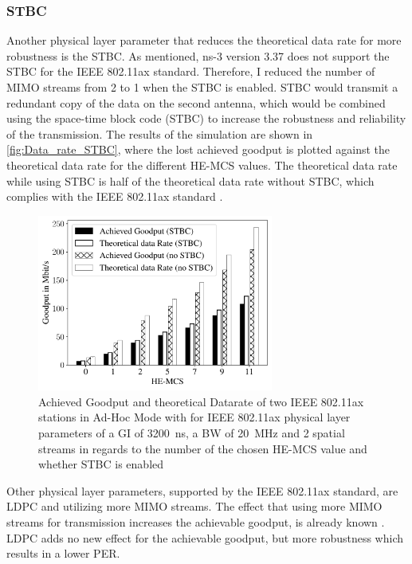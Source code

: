 \subsubsection*{\acf{STBC}}
\label{sec:STBCDataRate}
Another physical layer parameter that reduces the theoretical data rate for more robustness is the \ac{STBC}.
As mentioned, ns-3 version 3.37 does not support the \ac{STBC} for the IEEE 802.11ax standard.
Therefore, I reduced the number of
\ac{MIMO} streams from \num{2} to \num{1} when the \ac{STBC} is enabled. \ac{STBC} would transmit a redundant copy of the data on the second antenna, which would be combined
using the space-time block code (STBC) to increase the robustness and reliability of the transmission.
The results of the simulation are shown in \autoref{fig:Data_rate_STBC}, where the lost achieved goodput is plotted against
the theoretical data rate for the different \ac{HE}-\ac{MCS} values.
The theoretical data rate while using \ac{STBC} is half of the theoretical data rate without \ac{STBC},
which complies with the IEEE 802.11ax standard \cite{ieee_standard_2021ax}.
\begin{figure}[H]%
   \centering
   \includegraphics[width=0.69\textwidth]{Latex/figures/STBC_dataRate_simulation}
   \caption{Achieved Goodput and theoretical Datarate of two IEEE 802.11ax stations in Ad-Hoc Mode with for IEEE 802.11ax physical layer parameters of a \ac{GI} of \SI{3200}{\nano\second}, a \ac{BW} of \SI{20}{\mega\hertz} and 2 spatial streams  in regards to the number of the chosen \ac{HE}-\ac{MCS} value and whether \acf{STBC} is enabled}%
   \label{fig:Data_rate_STBC}%
\end{figure}

Other physical layer parameters, supported by the IEEE 802.11ax standard, are \ac{LDPC} and utilizing more \ac{MIMO} streams.
The effect that using more \ac{MIMO} streams for transmission increases the achievable goodput, is already known \cite[294-296]{sauter_wireless_2022, ieee_standard_2021ax, ieee_standard_2020}.
\ac{LDPC} adds no new effect for the achievable goodput, but more robustness which results in a lower \ac{PER}.

